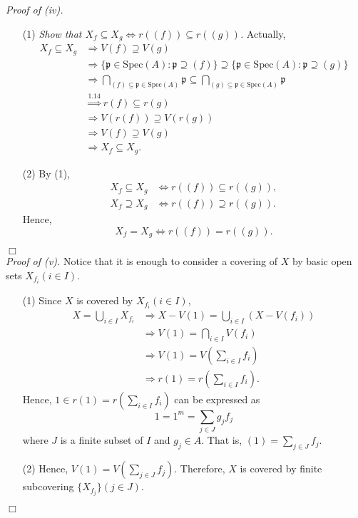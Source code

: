 \documentclass{article}
\begin{document}
\emph{Proof of (iv).}
\begin{enumerate}
\item[(1)]
\emph{Show that
$X_f \subseteq X_g \Longleftrightarrow r((f)) \subseteq r((g))$.}
Actually,
\begin{align*}
X_f \subseteq X_g
&\Longrightarrow V(f) \supseteq V(g) \\
&\Longrightarrow \{ \mathfrak{p} \in \mathrm{Spec}(A) : \mathfrak{p} \supseteq (f) \}
  \supseteq \{ \mathfrak{p} \in \mathrm{Spec}(A) : \mathfrak{p} \supseteq (g) \} \\
&\Longrightarrow \bigcap_{(f) \subseteq \mathfrak{p} \in \mathrm{Spec}(A)} \mathfrak{p}
  \subseteq \bigcap_{(g) \subseteq \mathfrak{p} \in \mathrm{Spec}(A)} \mathfrak{p}  \\
&\overset{1.14}{\Longrightarrow} r(f) \subseteq r(g) \\
&\Longrightarrow V(r(f)) \supseteq V(r(g)) \\
&\Longrightarrow V(f) \supseteq V(g) \\
&\Longrightarrow X_f \subseteq X_g.
\end{align*}
\item[(2)]
By (1),
\begin{align*}
X_f \subseteq X_g &\Longleftrightarrow r((f)) \subseteq r((g)), \\
X_f \supseteq X_g &\Longleftrightarrow r((f)) \supseteq r((g)).
\end{align*}
Hence,
$$X_f = X_g \Longleftrightarrow r((f)) = r((g)).$$
\end{enumerate}
$\Box$ \\



\emph{Proof of (v).}
Notice that it is enough to consider a covering of $X$
by basic open sets $X_{f_i} (i \in I)$.
\begin{enumerate}
\item[(1)]
Since $X$ is covered by $X_{f_i} (i \in I)$,
\begin{align*}
X = \bigcup_{i \in I} X_{f_i}
&\Longrightarrow X - V(1) = \bigcup_{i \in I} (X - V(f_i)) \\
&\Longrightarrow V(1) = \bigcap_{i \in I} V(f_i) \\
&\Longrightarrow V(1) = V\left( \sum_{i \in I} f_i \right) \\
&\Longrightarrow r(1) = r\left( \sum_{i \in I} f_i \right).
\end{align*}
Hence, $1 \in r(1) = r\left( \sum_{i \in I} f_i \right)$ can be expressed as
$$1 = 1^m = \sum_{j \in J} g_j f_j$$
where $J$ is a finite subset of $I$ and $g_j \in A$.
That is, $(1) = \sum_{j \in J} f_j$.
\item[(2)]
Hence, $V(1) = V\left( \sum_{j \in J} f_j \right)$.
Therefore, $X$ is covered by finite subcovering $\{X_{f_j}\} (j \in J)$.
\end{enumerate}
$\Box$ \\
\end{document}
